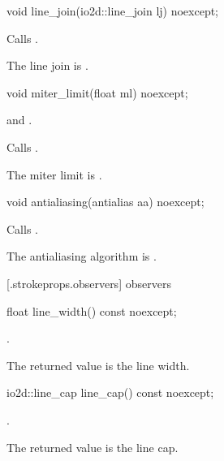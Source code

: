 %
\begin{itemdecl}
void line_join(io2d::line_join lj) noexcept;
\end{itemdecl}
\begin{itemdescr}
\pnum
\effects
Calls .

\remarks
The line join is .
\end{itemdescr}

%
\begin{itemdecl}
void miter_limit(float ml) noexcept;
\end{itemdecl}
\begin{itemdescr}
\pnum
\requires
{} and .

\pnum
\effects
Calls .

\remarks
The miter limit is .
\end{itemdescr}

%
\begin{itemdecl}
void antialiasing(antialias aa) noexcept;
\end{itemdecl}
\begin{itemdescr}
\pnum
\effects
Calls .

\remarks
The antialiasing algorithm is .
\end{itemdescr}

 [\iotwod.strokeprops.observers] { observers}

%
\begin{itemdecl}
float line_width() const noexcept;
\end{itemdecl}
\begin{itemdescr}
\pnum
\returns
{}.

\pnum
\remarks
The returned value is the line width.
\end{itemdescr}

%
\begin{itemdecl}
io2d::line_cap line_cap() const noexcept;
\end{itemdecl}
\begin{itemdescr}
\pnum
\returns
{}.

\pnum
\remarks
The returned value is the line cap.
\end{itemdescr}

